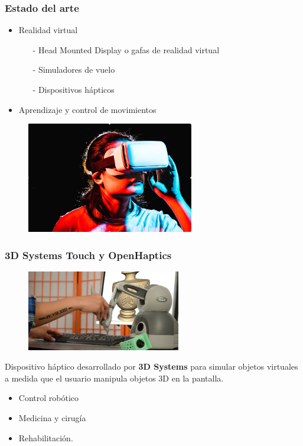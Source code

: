 \documentclass[pdf]{beamer}
\begin{document}
\begin{frame}
	\frametitle{Estado del arte}
	\begin{itemize}
		\item Realidad virtual
		\begin{itemize}
			\item[-] Head Mounted Display o gafas de realidad virtual
			\item[-]Simuladores de vuelo
			\item[-] Dispositivos hápticos
		\end{itemize}
		\item Aprendizaje y control de movimientos
	\end{itemize}
\begin{figure}
	\centering
	\includegraphics[width=0.65\textwidth]{virtual-reality}
\end{figure}
\end{frame}
\begin{frame}
	\frametitle{3D Systems Touch y OpenHaptics}
	
	\begin{figure}
		\centering
		\includegraphics[width=0.6\textwidth]{touch}
	\end{figure}
	
	Dispositivo háptico desarrollado por \textbf{3D Systems} para simular objetos virtuales a medida que el usuario manipula objetos 3D en la pantalla.
	\begin{itemize}
		\item Control robótico
		\item Medicina y cirugía
		\item Rehabilitación.
	\end{itemize}		
\end{frame}
\end{document}
